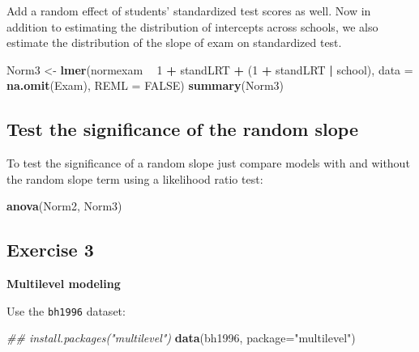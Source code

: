\documentclass[
]{book}
\newenvironment{Shaded}{\begin{snugshade}}{\end{snugshade}}
\newcommand{\CommentTok}[1]{\textcolor[rgb]{0.56,0.35,0.01}{\textit{#1}}}
\newcommand{\DataTypeTok}[1]{\textcolor[rgb]{0.13,0.29,0.53}{#1}}
\newcommand{\DecValTok}[1]{\textcolor[rgb]{0.00,0.00,0.81}{#1}}
\newcommand{\KeywordTok}[1]{\textcolor[rgb]{0.13,0.29,0.53}{\textbf{#1}}}
\newcommand{\NormalTok}[1]{#1}
\newcommand{\OperatorTok}[1]{\textcolor[rgb]{0.81,0.36,0.00}{\textbf{#1}}}
\newcommand{\OtherTok}[1]{\textcolor[rgb]{0.56,0.35,0.01}{#1}}
\newcommand{\StringTok}[1]{\textcolor[rgb]{0.31,0.60,0.02}{#1}}
\begin{document}
Add a random effect of students' standardized test scores as well. Now in addition to estimating the distribution of intercepts across schools, we also estimate the distribution of the slope of exam on standardized test.

\begin{Shaded}
\begin{Highlighting}[]
\NormalTok{  Norm3 <-}\StringTok{ }\KeywordTok{lmer}\NormalTok{(normexam }\OperatorTok{~}\StringTok{ }\DecValTok{1} \OperatorTok{+}\StringTok{ }\NormalTok{standLRT }\OperatorTok{+}\StringTok{ }\NormalTok{(}\DecValTok{1} \OperatorTok{+}\StringTok{ }\NormalTok{standLRT }\OperatorTok{|}\StringTok{ }\NormalTok{school), }
                \DataTypeTok{data =} \KeywordTok{na.omit}\NormalTok{(Exam), }\DataTypeTok{REML =} \OtherTok{FALSE}\NormalTok{) }
  \KeywordTok{summary}\NormalTok{(Norm3) }
\end{Highlighting}
\end{Shaded}

\hypertarget{test-the-significance-of-the-random-slope}{%
\subsection{Test the significance of the random slope}\label{test-the-significance-of-the-random-slope}}

To test the significance of a random slope just compare models with and without the random slope term using a likelihood ratio test:

\begin{Shaded}
\begin{Highlighting}[]
  \KeywordTok{anova}\NormalTok{(Norm2, Norm3) }
\end{Highlighting}
\end{Shaded}

\hypertarget{exercise-3-1}{%
\subsection{Exercise 3}\label{exercise-3-1}}

\textbf{Multilevel modeling}

Use the \texttt{bh1996} dataset:

\begin{Shaded}
\begin{Highlighting}[]
\CommentTok{## install.packages("multilevel")}
\KeywordTok{data}\NormalTok{(bh1996, }\DataTypeTok{package=}\StringTok{"multilevel"}\NormalTok{)}
\end{Highlighting}
\end{Shaded}
\end{document}

